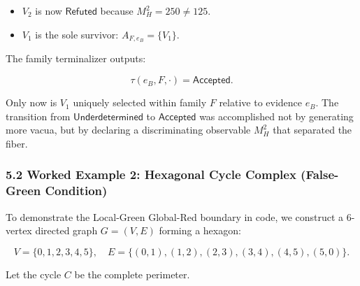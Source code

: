 \documentclass[
  10pt,
]{article}
\begin{document}
\begin{itemize}
\item
  \hypertarget{math-E0187-0308}{}{\(V_2\)} is now \hypertarget{math-E0152-0309}{}{\(\mathsf{Refuted}\)} because \hypertarget{math-E0208-0310}{}{\(M_H^2 = 250 \ne 125\)}.
\item
  \hypertarget{math-E0182-0311}{}{\(V_1\)} is the sole survivor: \hypertarget{math-E0209-0312}{}{\(A_{F,e_B} = \{V_1\}\)}.
\end{itemize}

The family terminalizer outputs:

\hypertarget{math-E0210-0313}{}{\[\tau(e_B, F, \cdot) = \mathsf{Accepted}.\]}

Only now is \hypertarget{math-E0182-0314}{}{\(V_1\)} uniquely selected within family \hypertarget{math-E0005-0315}{}{\(F\)} relative to evidence \hypertarget{math-E0206-0316}{}{\(e_B\)}. The transition from \hypertarget{math-E0168-0317}{}{\(\mathsf{Underdetermined}\)} to \hypertarget{math-E0164-0318}{}{\(\mathsf{Accepted}\)} was accomplished not by generating more vacua, but by declaring a discriminating observable \hypertarget{math-E0181-0319}{}{\(M_H^2\)} that separated the fiber.

\subsubsection{5.2 Worked Example 2: Hexagonal Cycle Complex (False-Green Condition)}\label{worked-example-2-hexagonal-cycle-complex-false-green-condition}

To demonstrate the Local-Green Global-Red boundary in code, we construct a 6-vertex directed graph \hypertarget{math-E0062-0320}{}{\(G = (V, E)\)} forming a hexagon:

\hypertarget{math-E0211-0321}{}{\[V = \{0, 1, 2, 3, 4, 5\}, \quad E = \{(0, 1), (1, 2), (2, 3), (3, 4), (4, 5), (5, 0)\}.\]}

Let the cycle \hypertarget{math-E0097-0322}{}{\(C\)} be the complete perimeter.
\end{document}
